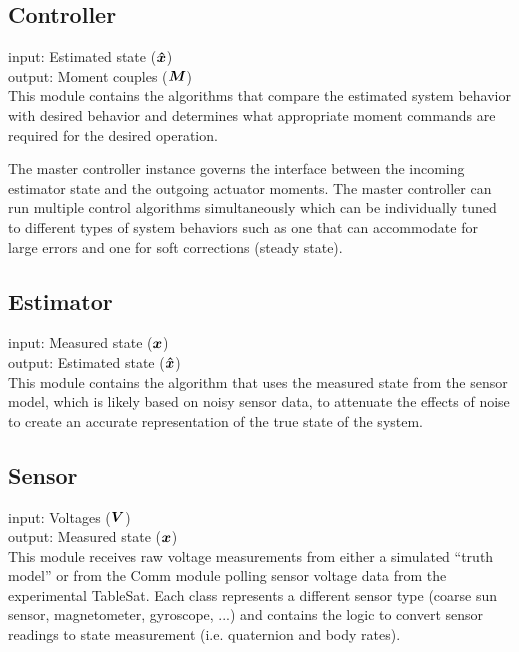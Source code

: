 \subsection{Controller}
\label{subsec:Controller}

input: Estimated state ($\boldsymbol{\hat{x}}$)\\
output: Moment couples ($\boldsymbol{M}$)\\

This module contains the algorithms that compare the estimated system behavior with desired behavior and determines what appropriate moment commands are required for the desired operation.

The master controller instance governs the interface between the incoming estimator state and the outgoing actuator moments. The master controller can run multiple control algorithms simultaneously which can be individually tuned to different types of system behaviors such as one that can accommodate for large errors and one for soft corrections (steady state).


\subsection{Estimator}
\label{subsec:Estimator}

input: Measured state ($\boldsymbol{x}$)\\
output: Estimated state ($\boldsymbol{\hat{x}}$)\\

This module contains the algorithm that uses the measured state from the sensor model, which is likely based on noisy sensor data, to attenuate the effects of noise to create an accurate representation of the true state of the system.

\subsection{Sensor}
\label{subsec:Sensor}

input: Voltages ($\boldsymbol{V}$)\\
output: Measured state ($\boldsymbol{x}$)\\

This module receives raw voltage measurements from either a simulated ``truth model'' or from the Comm module polling sensor voltage data from the experimental TableSat.  Each class represents a different sensor type (coarse sun sensor, magnetometer, gyroscope, ...) and contains the logic to convert sensor readings to state measurement (i.e. quaternion and body rates).


